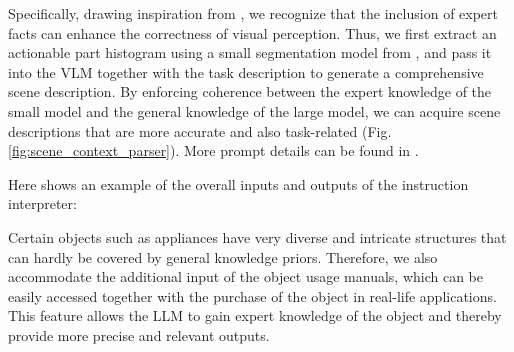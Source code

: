 Specifically, drawing inspiration from \cite{greff2020binding}, we recognize that the inclusion of expert facts can enhance the correctness of visual perception. Thus, we first extract an actionable part histogram using a small segmentation model from \cite{geng2022gapartnet}, and pass it into the VLM together with the task description to generate a comprehensive scene description.
By enforcing coherence between the expert knowledge of the small model and the general knowledge of the large model, we can acquire scene descriptions that are more accurate and also task-related (Fig. \ref{fig:scene_context_parser}).
More prompt details can be found in \SupplementaryMaterial.


Here shows an example of the overall inputs and outputs of the instruction interpreter:

\vspace{.5ex}
\noindent{}
\vspace{.5ex}

Certain objects such as appliances have very diverse and intricate structures that can hardly be covered by general knowledge priors. Therefore, we also accommodate the additional input of the object usage manuals, which can be easily accessed together with the purchase of the object in real-life applications. This feature allows the LLM to gain expert knowledge of the object and thereby provide more precise and relevant outputs.

